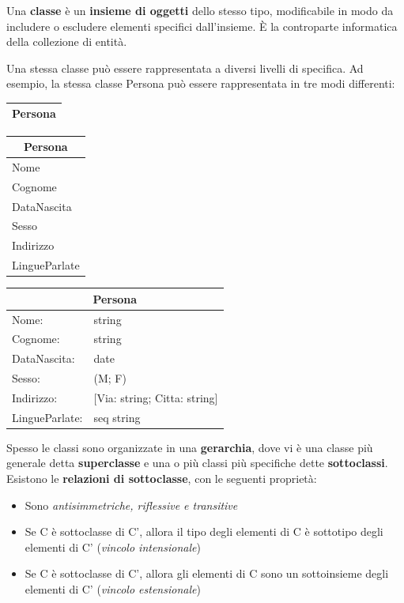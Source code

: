 \documentclass[11pt, a4paper, titlepage, oneside]{scrbook}
\begin{document}
\begin{Definizione}[Classe]
\label{def-classe}
Una \textbf{classe} è un \textbf{insieme di oggetti} dello stesso tipo, modificabile in modo da includere o escludere elementi specifici dall'insieme. È la controparte informatica della collezione di entità.
\end{Definizione}

Una stessa classe può essere rappresentata a diversi livelli di specifica. Ad esempio, la stessa classe Persona può essere rappresentata in tre modi differenti:

\begin{center}
\begin{tabular}{|c|}
\hline
\textbf{Persona} \\
\hline
\end{tabular}
\quad
\begin{tabular}{|l|}
\hline
\multicolumn{1}{|c|}{\textbf{Persona}} \\
\hline
Nome \\
Cognome \\
DataNascita \\
Sesso \\
Indirizzo \\
LingueParlate \\
\hline
\end{tabular}
\quad
\begin{tabular}{|ll|}
\hline
\multicolumn{2}{|c|}{\textbf{Persona}} \\
\hline
Nome: & string \\
Cognome: & string \\
DataNascita: & date \\
Sesso: & (M; F) \\
Indirizzo: & [Via: string; Citta: string] \\
LingueParlate: & seq string \\
\hline
\end{tabular}
\end{center}

\begin{Definizione}
\label{def-gerarchie-classi}
Spesso le classi sono organizzate in una \textbf{gerarchia}, dove vi è una classe più generale detta \textbf{superclasse} e una o più classi più specifiche dette \textbf{sottoclassi}. Esistono le \textbf{relazioni di sottoclasse}, con le seguenti proprietà:
\begin{itemize}
    \item Sono \textit{antisimmetriche, riflessive e transitive}
    \item Se C è sottoclasse di C', allora il tipo degli elementi di C è sottotipo degli elementi di C' (\textit{vincolo intensionale})
    \item Se C è sottoclasse di C', allora gli elementi di C sono un sottoinsieme degli elementi di C' (\textit{vincolo estensionale})
\end{itemize}
\end{Definizione}
\end{document}
